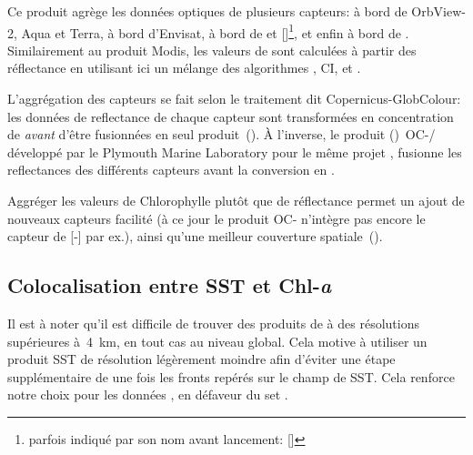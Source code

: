Ce produit agrège les données optiques de plusieurs capteurs:  à bord de OrbView-2,  Aqua et Terra,  à bord d'Envisat,  à bord de  et []\footnote{parfois indiqué par son nom avant lancement: []}, et enfin  à bord de .
Similairement au produit Modis, les valeurs de  sont calculées à partir des réflectance en utilisant ici un mélange des algorithmes , CI, et .

\begin{note}[label={note:merge-chl-or-rrs}]
  L'aggrégation des capteurs se fait selon le traitement dit Copernicus-GlobColour: les données de reflectance de chaque capteur sont transformées en concentration de  \emph{avant} d'être fusionnées en seul produit~(\cite{garnesson_2019}).
  À l'inverse, le produit ()~OC-/ développé par le Plymouth Marine Laboratory pour le même projet , fusionne les reflectances des différents capteurs avant la conversion en .

  Aggréger les valeurs de Chlorophylle plutôt que de réflectance permet  un ajout de nouveaux capteurs facilité (à ce jour le produit OC- n'intègre pas encore le capteur de [-] par ex.), ainsi qu'une meilleur couverture spatiale~(\cite{garnesson_2019}).
\end{note}

\begin{figure}
  \centering
  \label{fig:comparaison-chl}
\end{figure}

\subsection{Colocalisation entre SST et Chl-\textit{a}}

Il est à noter qu'il est difficile de trouver des produits de  à des résolutions supérieures à~\qty{4}{\km}, en tout cas au niveau global.
Cela motive à utiliser un produit SST de résolution légèrement moindre afin d'éviter une étape supplémentaire de  une fois les fronts repérés sur le champ de SST.
Cela renforce notre choix pour les données , en défaveur du set .

